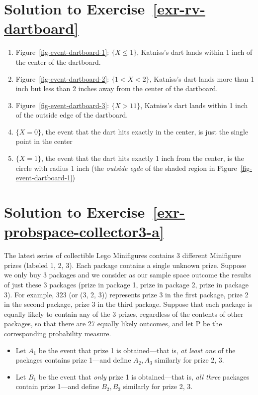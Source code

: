 \documentclass[
  letterpaper,
  DIV=11,
  numbers=noendperiod]{scrreprt}
\providecommand{\tightlist}{%
  \setlength{\itemsep}{0pt}\setlength{\parskip}{0pt}}
\theoremstyle{plain}
\theoremstyle{definition}
\theoremstyle{definition}
\theoremstyle{definition}
\theoremstyle{remark}
\begin{document}
\section{\texorpdfstring{Solution to
Exercise~\ref{exr-rv-dartboard}}{Solution to Exercise~}}\label{solution-to-exr-rv-dartboard}

\begin{enumerate}
\def\labelenumi{\arabic{enumi}.}
\tightlist
\item
  Figure~\ref{fig-event-dartboard-1}: \(\{X \le 1\}\), Katniss's dart
  lands within 1 inch of the center of the dartboard.
\item
  Figure~\ref{fig-event-dartboard-2}: \(\{1 < X < 2\}\), Katniss's dart
  lands more than 1 inch but less than 2 inches away from the center of
  the dartboard.
\item
  Figure~\ref{fig-event-dartboard-3}: \(\{X > 11\}\), Katniss's dart
  lands within 1 inch of the outside edge of the dartboard.
\item
  \(\{X = 0\}\), the event that the dart hits exactly in the center, is
  just the single point in the center
\item
  \(\{X = 1\}\), the event that the dart hits exactly 1 inch from the
  center, is the circle with radius 1 inch (the \emph{outside egde} of
  the shaded region in Figure~\ref{fig-event-dartboard-1})
\end{enumerate}

\section{\texorpdfstring{Solution to
Exercise~\ref{exr-probspace-collector3-a}}{Solution to Exercise~}}\label{solution-to-exr-probspace-collector3-a}

The latest series of collectible Lego Minifigures contains 3 different
Minifigure prizes (labeled 1, 2, 3). Each package contains a single
unknown prize. Suppose we only buy 3 packages and we consider as our
sample space outcome the results of just these 3 packages (prize in
package 1, prize in package 2, prize in package 3). For example, 323 (or
(3, 2, 3)) represents prize 3 in the first package, prize 2 in the
second package, prize 3 in the third package. Suppose that each package
is equally likely to contain any of the 3 prizes, regardless of the
contents of other packages, so that there are 27 equally likely
outcomes, and let \(\textrm{P}\) be the corresponding probability
measure.

\begin{itemize}
\tightlist
\item
  Let \(A_1\) be the event that prize 1 is obtained---that is, \emph{at
  least one} of the packages contains prize 1---and define \(A_2, A_3\)
  similarly for prize 2, 3.
\item
  Let \(B_1\) be the event that \emph{only} prize 1 is obtained---that
  is, \emph{all three} packages contain prize 1---and define
  \(B_2, B_3\) similarly for prize 2, 3.
\end{itemize}
\end{document}
